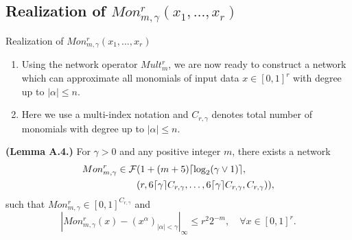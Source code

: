 \documentclass{if-beamer}
\DeclarePairedDelimiter{\ceil}{\lceil}{\rceil}
\begin{document}
\subsection{Realization of $Mon_{m,\gamma}^{r}(x_{1},\dots,x_{r})$}
\begin{frame}{Realization of $Mon_{m,\gamma}^{r}(x_{1},\dots,x_{r})$}
\begin{enumerate}
    \item Using the network operator $Mult_m^{r}$, we are now ready to construct a network which can approximate all monomials of input data $x\in[0,1]^{r}$ with degree up to $|\alpha| \leq n$. 
    \item Here we use a multi-index notation and $C_{r,\gamma}$ denotes total number of monomials with degree up to $|\alpha| \leq n$. 
\end{enumerate}
\begin{tcolorbox}
    \textbf{(Lemma A.4.)}
    For $\gamma>0$ and any positive integer $m$, there exists a network 
    \begin{align*}
        Mon_{m,\gamma}^{r} \in \mathcal{F}&(1+(m+5) \ceil{\log_{2} (\gamma \vee 1)},\\
            &(r,6\ceil{\gamma}C_{r,\gamma},\dots,6\ceil{\gamma}C_{r,\gamma},C_{r,\gamma})),
    \end{align*}
    such that $Mon_{m,\gamma}^{r}\in[0,1]^{C_{r,\gamma}}$ and 
    \begin{equation*}
        \left| Mon_{m,\gamma}^{r}(x)- (x^{\alpha})_{|\alpha|<\gamma} \right|_{\infty} \leq r^{2}2^{-m},
        \quad \forall x \in [0,1]^{r}.
    \end{equation*}
\end{tcolorbox}

\end{frame}
\end{document}

